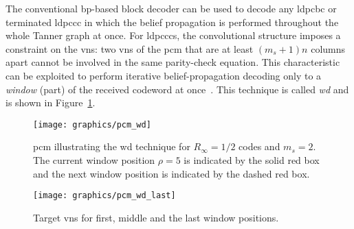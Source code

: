 The conventional \gls{bp}-based block decoder can be used to decode any \gls{ldpcbc} or terminated \gls{ldpccc} in which the belief propagation is performed throughout the whole Tanner graph at once. For \glspl{ldpccc}, the convolutional structure imposes a constraint on the \glspl{vn}: two \glspl{vn} of the \gls{pcm} that are at least $(m_s+1)n$ columns apart cannot be involved in the same parity-check equation. This characteristic can be exploited to perform iterative belief-propagation decoding only to a \emph{window} (part) of the received codeword at once~\cite{Iyengar2012}. This technique is called \emph{\gls{wd}} and is shown in Figure~\ref{fig:wd}.
\begin{figure}[htbp]
  \centering
  \texttt{[image: graphics/pcm\_wd]}
  \caption{\gls{pcm} illustrating the \acrlong{wd} technique for $R_\infty=1/2$ codes and $m_s=2$. The current window position $\rho=5$ is indicated by the solid red box and the next window position is indicated by the dashed red box.}
  \label{fig:wd}
\end{figure}

\begin{figure}[htbp]
  \centering
  \texttt{[image: graphics/pcm\_wd\_last]}
  \caption{Target \glspl{vn} for first, middle and the last window positions.}
  \label{fig:wd_last}
\end{figure}

